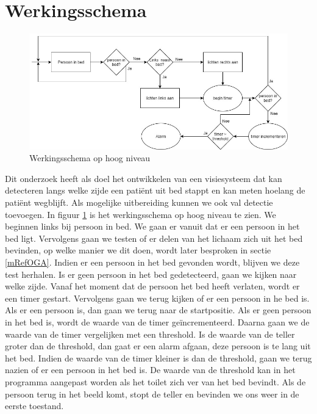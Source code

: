\section{Werkingsschema}
\label{MRefWeS}
\begin{figure}[hbp]
	\includegraphics[scale=0.5]{HoogNiveauBlokDiagram}
	\caption{Werkingsschema op hoog niveau}
	\label{imgWeS}
\end{figure}
Dit onderzoek heeft als doel het ontwikkelen van een visiesysteem dat kan detecteren langs welke zijde een pati\"ent uit bed stappt en kan meten hoelang de pati\"ent wegblijft. Als mogelijke uitbereiding kunnen we ook val detectie toevoegen. In figuur \ref{imgWeS} is het werkingsschema op hoog niveau te zien.
We beginnen links bij persoon in bed. We gaan er vanuit dat er een persoon in het bed ligt.  Vervolgens gaan we testen of er delen van het lichaam zich uit het bed bevinden, op welke manier we dit doen, wordt later besproken in sectie \ref{mRefOGA}. Indien er een persoon in het bed gevonden wordt, blijven we deze test herhalen. Is er geen persoon in het bed gedetecteerd, gaan we kijken naar welke zijde. Vanaf het moment dat de persoon het bed heeft verlaten, wordt er een timer gestart. Vervolgens gaan we terug kijken of er een persoon in he bed is. Als er een persoon is, dan gaan we terug naar de startpositie. Als er geen persoon in het bed is, wordt de waarde van de timer ge\"incrementeerd. Daarna gaan we de waarde van de timer vergelijken met een threshold. Is de waarde van de teller groter dan de threshold, dan gaat er een alarm afgaan, deze persoon is te lang uit het bed. Indien de waarde van de timer kleiner is dan de threshold, gaan we terug nazien of er een persoon in het bed is.  De waarde van de threshold kan in het programma aangepast worden als het toilet zich ver van het bed bevindt.  Als de persoon terug in het beeld komt, stopt de teller en bevinden we ons weer in de eerste toestand.

